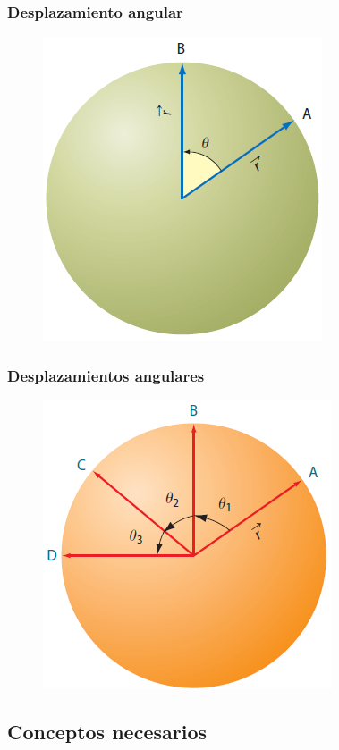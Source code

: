\documentclass[14pt]{beamer}
\begin{document}
\begin{frame}
\frametitle{Desplazamiento angular}
\vspace*{-1cm}
\begin{figure}
    \centering
    \includegraphics[scale=0.75]{Imagenes/Movimiento_Circular_01.png}
\end{figure}
\end{frame}
\begin{frame}
\frametitle{Desplazamientos angulares}
\vspace*{-1cm}
\begin{figure}
    \centering
    \includegraphics[scale=0.75]{Imagenes/Movimiento_Circular_02.png}
\end{figure}
\end{frame}

\subsection{Conceptos necesarios}
\end{document}
